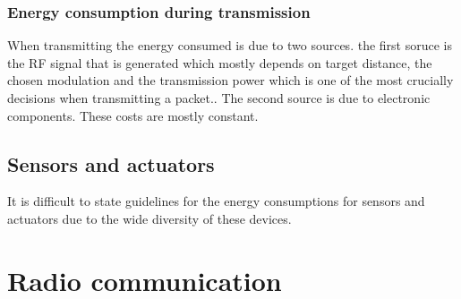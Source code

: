   \subsubsection{Energy consumption during transmission}
  When transmitting the energy consumed is due to two sources. the first soruce is the RF signal that is generated which mostly depends on target distance, the chosen modulation and the transmission power which is one of the most crucially decisions when transmitting a packet.. The second source is due to electronic components. These costs are mostly constant.
  
  \subsection{Sensors and actuators}
  It is difficult to state guidelines for the energy consumptions for sensors and actuators due to the wide diversity of these devices.
  
 
\section{Radio communication}